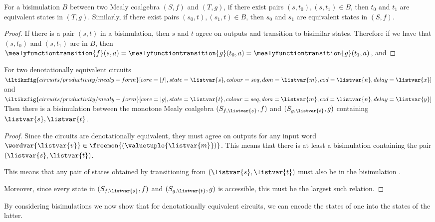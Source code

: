 \begin{lemma}
    For a bisimulation \(B\) between two Mealy coalgebra \((S,f)\) and
    \((T,g)\), if there exist pairs \((s,t_0), (s,t_1) \in B\), then
    \(t_0\) and \(t_1\) are equivalent states in \((T,g)\).
    Similarly, if there exist pairs \((s_0,t), (s_1,t) \in B\), then
    \(s_0\) and \(s_1\) are equivalent states in \((S,f)\).
\end{lemma}
\begin{proof}
    If there is a pair \((s,t)\) in a bisimulation, then \(s\) and \(t\) agree
    on outputs and transition to bisimilar states.
    Therefore if we have that \((s,t_0)\) and \((s,t_1)\) are in \(B\), then
    \(
    \mealyfunctiontransition{f}(s,a)
    =
    \mealyfunctiontransition{g}(t_0,a)
    =
    \mealyfunctiontransition{g}(t_1,a)
    \), and
\end{proof}

\begin{lemma}
    For two denotationally equivalent circuits \(
    \iltikzfig{circuits/productivity/mealy-form}[core=|f|,state=\listvar{s},colour=seq,dom=\listvar{m},cod=\listvar{n},delay=\listvar{x}]
    \) and \(
    \iltikzfig{circuits/productivity/mealy-form}[core=|g|,state=\listvar{t},colour=seq,dom=\listvar{m},cod=\listvar{n},delay=\listvar{y}]
    \)
    Then there is a bisimulation between the monotone Mealy coalgebra
    \((S_{f,\listvar{s}},f)\) and \((S_{g,\listvar{t}},g)\) containing
    \(\listvar{s},\listvar{t}\).
\end{lemma}
\begin{proof}
    Since the circuits are denotationally equivalent, they must agree on outputs
    for any input word \(
    \wordvar{\listvar{v}} \in \freemon{(\valuetuple{\listvar{m}})}
    \).
    This means that there is at least a bisimulation containing the pair
    \((\listvar{s},\listvar{t})\).

    This means that any pair of states obtained by transitioning from
    \((\listvar{s},\listvar{t})\) must also be in the bisimulation .

    Moreover, since every state in
    \((S_{f,\listvar{s}},f)\) and \((S_{g,\listvar{t}},g)\) is accessible, this
    must be the largest such relation.
\end{proof}

By considering bisimulations we now show that for denotationally
equivalent circuits, we can encode the states of one into the states of the
latter.

